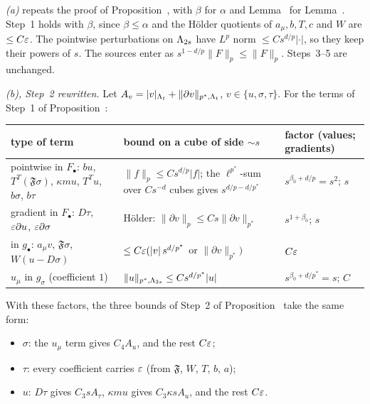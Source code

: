 \begin{detail}\label{d9:lp-system}
\emph{(a)} repeats the proof of Proposition~, with $\beta$ for $\alpha$ and Lemma~ for Lemma~. Step~1 holds with $\beta$, since $\beta\le\alpha$ and the H\"older quotients of $a_\mu,b,T,c$ and $W$ are $\le C\varepsilon$. The pointwise perturbations on $\Lambda_{2s}$ have $L^p$ norm $\le Cs^{d/p}|\cdot|$, so they keep their powers of $s$. The sources enter as $s^{1-d/p}\|F\|_p\le\|F\|_p$. Steps~3--5 are unchanged.

\emph{(b), Step~2 rewritten.} Let $A_v=|v|_{\Lambda_t}+\|\partial v\|_{p^*,\Lambda_t}$, $v\in\{u,\sigma,\tau\}$. For the terms of Step~1 of Proposition~:
\begin{center}\small
\begin{tabularx}{\textwidth}{@{}>{\raggedright\arraybackslash}p{}>{\raggedright\arraybackslash}X>{\raggedright\arraybackslash}p{}@{}}
\toprule
type of term & bound on a cube of side $\sim s$ & factor (values; gradients)\\
\midrule
pointwise in $F_\bullet$: $bu$, $T^T(\mathfrak F\sigma)$, $\kappa mu$, $T^Tu$, $b\sigma$, $b\tau$ & $\|f\|_{p}\le Cs^{d/p}|f|$; the $\ell^{p^*}$-sum over $Cs^{-d}$ cubes gives $s^{d/p-d/p^*}$ & $s^{\beta_0+d/p}=s^2$; $s$\\
gradient in $F_\bullet$: $D\tau$, $\varepsilon\partial u$, $\varepsilon\partial\sigma$ & H\"older: $\|\partial v\|_p\le Cs\|\partial v\|_{p^*}$ & $s^{1+\beta_0}$; $s$\\
in $g_\bullet$: $a_\mu v$, $\mathfrak F\sigma$, $W(u-D\sigma)$ & $\le C\varepsilon(|v|\,s^{d/p^*}$ or $\|\partial v\|_{p^*})$ & $C\varepsilon$\\
$u_\mu$ in $g_\sigma$ (coefficient $1$) & $\|u\|_{p^*,\Lambda_{3s}}\le Cs^{d/p^*}|u|$ & $s^{\beta_0+d/p^*}=s$; $C$\\
\bottomrule
\end{tabularx}
\end{center}
With these factors, the three bounds of Step~2 of Proposition~ take the same form:
\begin{itemize}
\item $\sigma$: the $u_\mu$ term gives $C_4A_u$, and the rest $C\varepsilon$;
\item $\tau$: every coefficient carries $\varepsilon$ (from $\mathfrak F$, $W$, $T$, $b$, $a$);
\item $u$: $D\tau$ gives $C_3sA_\tau$, $\kappa mu$ gives $C_3\kappa sA_u$, and the rest $C\varepsilon$.

\end{itemize}
\end{detail}
